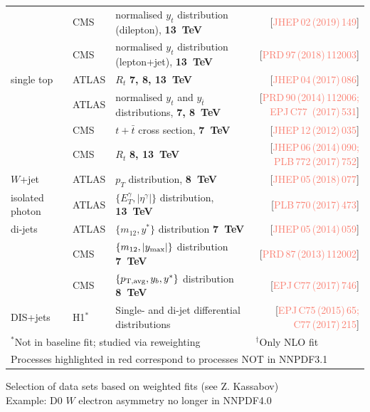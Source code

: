 \documentclass{beamer}
\begin{document}
\begin{frame}
\begin{tabularx}{\textwidth}{llXr}
            & CMS         & normalised $y_t$ distribution (dilepton), {\bf 13~TeV}           & [{\textcolor{salmon}{JHEP\,02\,(2019)\,149}}]\\
            & CMS         & normalised $y_t$ distribution (lepton+jet), {\bf 13~TeV}         & [{\textcolor{salmon}{PRD\,97\,(2018)\,112003}}]\\ 
 \midrule
 \alert{single top} 
            & ATLAS       & $R_t$ {\bf 7, 8, 13~TeV}                                         & [{\textcolor{salmon}{JHEP\,04\,(2017)\,086}}]\\
            & ATLAS       & normalised $y_t$ and $y_{\bar{t}}$ distributions, {\bf 7, 8~TeV} & [{\textcolor{salmon}{PRD\,90\,(2014)\,112006; EPJ\,C77\, (2017)\,531}}]\\
            & CMS         & $t+\bar{t}$ cross section, {\bf 7~TeV}                           & [{\textcolor{salmon}{JHEP\,12\,(2012)\,035}}]\\
            & CMS         & $R_t$ {\bf 8, 13~TeV}                                            & [{\textcolor{salmon}{JHEP\,06\,(2014)\,090; PLB\,772\,(2017)\,752}}]\\
 \alert{$W$+jet}    
            & ATLAS       & $p_T$ distribution, {\bf 8~TeV}                                  & [{\textcolor{salmon}{JHEP\,05\,(2018)\,077}}]\\        
 \alert{isolated photon} 
            & ATLAS       & $\{E_T^\gamma,|\eta^\gamma|\}$ distribution, {\bf 13~TeV}        & [{\textcolor{salmon}{PLB\,770\,(2017)\,473}}]\\     
 \alert{di-jets}    
            & ATLAS       & $\{m_{12},y^*\}$ distribution {\bf 7~TeV}                        & [{\textcolor{salmon}{JHEP\,05\,(2014)\,059}}]\\
            & CMS         & $\{m_{12},|y_{\rm max}|\}$ distribution {\bf 7~TeV}              & [{\textcolor{salmon}{PRD\,87\,(2013)\,112002}}]\\
            & CMS         & $\{p_{\rm T,avg},y_b,y^*\}$ distribution {\bf 8~TeV}             & [{\textcolor{salmon}{EPJ\,C77\,(2017)\,746}}]\\           
 \alert{DIS+jets}   
            & H1$^*$      & Single- and di-jet differential distributions                         & [{\textcolor{salmon}{EPJ\,C75\,(2015)\,65; C77\,(2017)\,215}}]\\
 \bottomrule 
 \multicolumn{3}{l}{$^*$Not in baseline fit; studied via reweighting} &
 \multicolumn{1}{l}{$^\dag$Only NLO fit}\\
 \multicolumn{4}{l}{Processes highlighted in \alert{red} correspond to processes NOT in NNPDF3.1}\\
 \end{tabularx}
 \vspace{-0.2cm}
 \scriptsize
 \begin{block}{}
  \centering
  Selection of data sets based on weighted fits (see Z. Kassabov)\\
  {\scriptsize Example: D0 $W$ electron asymmetry no longer in NNPDF4.0}\\
 \end{block}
\end{frame}
\end{document}
